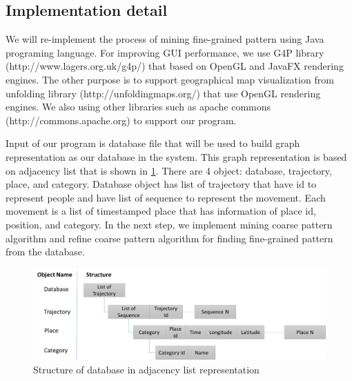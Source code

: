 \documentclass[conference]{IEEEtran}
\begin{document}
\subsection{Implementation detail}
We will re-implement the process of mining fine-grained pattern using Java programing language. For improving GUI performance, we use G4P library (http://www.lagers.org.uk/g4p/) that based on OpenGL and JavaFX rendering engines. The other purpose is to support geographical map visualization from unfolding library (http://unfoldingmaps.org/) that use OpenGL rendering engines. We also using other libraries such as apache commons (http://commons.apache.org) to support our program. 
\par 
Input of our program is database file that will be used to build graph representation as our database in the system. This graph representation is based on adjacency list that is shown in \ref{fig:adjacency}. There are 4 object: database, trajectory, place, and category. Database object has list of trajectory that have id to represent people and have list of sequence to represent the movement. Each movement is a list of timestamped place that has information of place id, position, and category. In the next step, we implement mining coarse pattern algorithm and refine coarse pattern algorithm for finding fine-grained pattern from the database. 
\begin{figure}[!h]
	\centering
	\includegraphics[width=0.7\linewidth]{adjacency}
	\caption{Structure of database in adjacency list representation}
	\label{fig:adjacency}
\end{figure}
\end{document}
